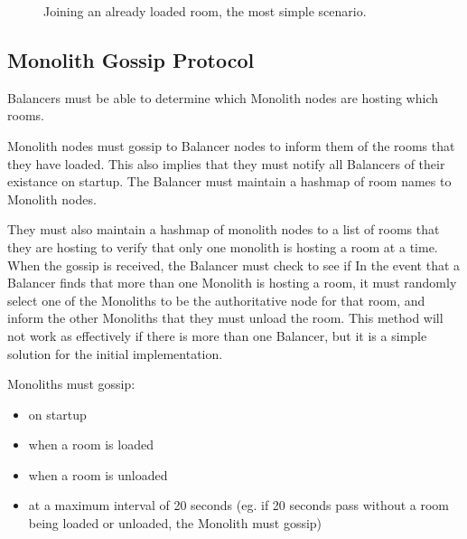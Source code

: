 \begin{figure}[!htb]
  \centering
  \caption{\label{Figure::join-room-happy-path} Joining an already loaded room, the most simple scenario.}
\end{figure}

\subsection{Monolith Gossip Protocol  }

Balancers must be able to determine which Monolith nodes are hosting which rooms.

Monolith nodes must gossip \cite{wikigossip}  to Balancer nodes to inform them of the rooms that they have loaded. This also implies that they must notify all Balancers of their existance on startup. The Balancer must maintain a hashmap of room names to Monolith nodes.

They must also maintain a hashmap of monolith nodes to a list of rooms that they are hosting to verify that only one monolith is hosting a room at a time. When the gossip is received, the Balancer must check to see if  In the event that a Balancer finds that more than one Monolith is hosting a room, it must randomly select one of the Monoliths to be the authoritative node for that room, and inform the other Monoliths that they must unload the room. This method will not work as effectively if there is more than one Balancer, but it is a simple solution for the initial implementation.

Monoliths must gossip:
\begin{itemize}
  \item on startup
  \item when a room is loaded
  \item when a room is unloaded
  \item at a maximum interval of 20 seconds (eg. if 20 seconds pass without a room being loaded or unloaded, the Monolith must gossip)
\end{itemize}

